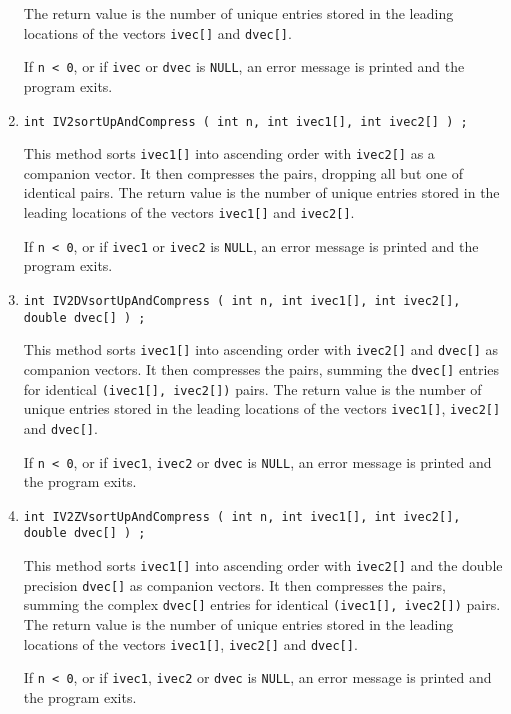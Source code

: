 \begin{enumerate}
The return value is the number of unique entries stored in the 
leading locations of the vectors {\tt ivec[]} and {\tt dvec[]}.
\par {}
If {\tt n < 0},
or if {\tt ivec} or {\tt dvec} is {\tt NULL},
an error message is printed and the program exits.
\item
\begin{verbatim}
int IV2sortUpAndCompress ( int n, int ivec1[], int ivec2[] ) ;
\end{verbatim}
This method sorts {\tt ivec1[]} into ascending order 
with {\tt ivec2[]} as a companion vector.
It then compresses the pairs, dropping all but one of identical pairs.
The return value is the number of unique entries stored in the 
leading locations of the vectors {\tt ivec1[]} and {\tt ivec2[]}.
\par {}
If {\tt n < 0},
or if {\tt ivec1} or {\tt ivec2} is {\tt NULL},
an error message is printed and the program exits.
\item
\begin{verbatim}
int IV2DVsortUpAndCompress ( int n, int ivec1[], int ivec2[], double dvec[] ) ;
\end{verbatim}
This method sorts {\tt ivec1[]} into ascending order 
with {\tt ivec2[]} and {\tt dvec[]} as companion vectors.
It then compresses the pairs, summing the {\tt dvec[]} entries for
identical {\tt (ivec1[], ivec2[])} pairs.
The return value is the number of unique entries stored in the 
leading locations of the vectors {\tt ivec1[]}, {\tt ivec2[]}
and {\tt dvec[]}.
\par {}
If {\tt n < 0},
or if {\tt ivec1}, {\tt ivec2} or {\tt dvec} is {\tt NULL},
an error message is printed and the program exits.
\item
\begin{verbatim}
int IV2ZVsortUpAndCompress ( int n, int ivec1[], int ivec2[], double dvec[] ) ;
\end{verbatim}
This method sorts {\tt ivec1[]} into ascending order 
with {\tt ivec2[]} and the double precision {\tt dvec[]} 
as companion vectors.
It then compresses the pairs, summing the complex {\tt dvec[]} entries 
for identical {\tt (ivec1[], ivec2[])} pairs.
The return value is the number of unique entries stored in the 
leading locations of the vectors {\tt ivec1[]}, {\tt ivec2[]}
and {\tt dvec[]}.
\par {}
If {\tt n < 0},
or if {\tt ivec1}, {\tt ivec2} or {\tt dvec} is {\tt NULL},
an error message is printed and the program exits.
\end{enumerate}

